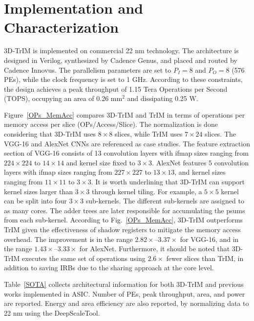 \section{Implementation and Characterization}

3D-TrIM is implemented on commercial 22 nm technology. The architecture is designed in Verilog, synthesized by Cadence Genus, and placed and routed by Cadence Innovus. The parallelism parameters are set to $P_I=8$ and $P_O=8$ (576 PEs), while the clock frequency is set to 1 GHz. According to these constraints, the design achieves a peak throughput of 1.15 Tera Operations per Second (TOPS), occupying an area of 0.26 mm$^2$ and dissipating 0.25 W. 


Figure~\ref{OPs_MemAcc} compares 3D-TrIM and TrIM\cite{Sestito_24_2} in terms of operations per memory access per slice (OPs/Access/Slice). The normalization is done considering that 3D-TrIM uses $8 \times 8$ slices, while TrIM uses $7 \times 24$ slices. The VGG-16\cite{Simonyan_15} and AlexNet\cite{Krizhevsky_12} CNNs are referenced as case studies. The feature extraction section of VGG-16 consists of 13 convolution layers with ifmap sizes ranging from $224\times224$ to $14\times 14$ and kernel size fixed to $3\times3$. AlexNet features 5 convolution layers with ifmap sizes ranging from $227\times227$ to $13\times13$, and kernel sizes ranging from $11\times11$ to $3\times3$. It is worth underlining that 3D-TrIM can support kernel sizes larger than $3 \times 3$ through kernel tiling. For example, a $5 \times 5$ kernel can be split into four $3 \times 3$ sub-kernels. The different sub-kernels are assigned to as many cores. The adder trees are later responsible for accumulating the psums from each sub-kernel. According to Fig.~\ref{OPs_MemAcc}, 3D-TrIM outperforms TrIM\cite{Sestito_24_2} given the effectiveness of shadow registers to mitigate the memory access overhead. The improvement is in the range $2.82\times$--$3.37\times$ for VGG-16, and in the range $1.43\times$--$3.33\times$ for AlexNet. Furthermore, it should be noted that 3D-TrIM executes the same set of operations using $2.6\times$ fewer slices than TrIM\cite{Sestito_24_2}, in addition to saving IRBs due to the sharing approach at the core level.


Table~\ref{SOTA} collects architectural information for both 3D-TrIM and previous works\cite{Jouppi_21,Chen_17,Feng_24} implemented in ASIC. Number of PEs, peak throughput, area, and power are reported. Energy and area efficiency are also reported, by normalizing data to 22 nm using the DeepScaleTool\cite{Sarangi_1,Sarangi_2}. 

